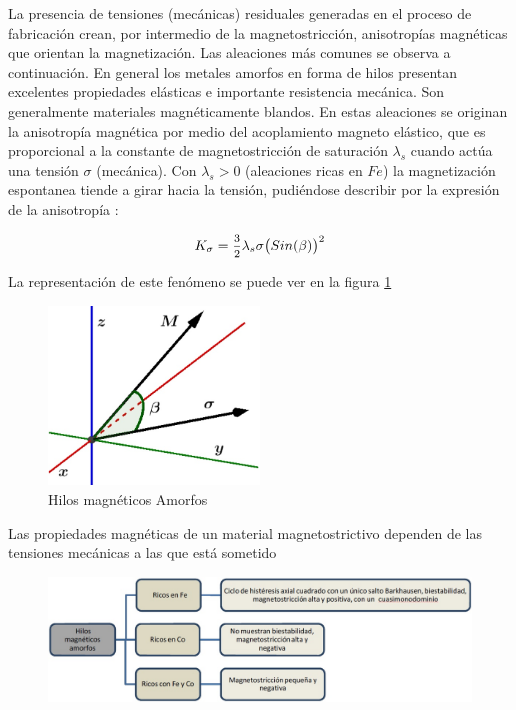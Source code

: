 La presencia de tensiones (mecánicas) residuales generadas en el proceso de fabricación crean, por intermedio de la magnetostricción, anisotropías magnéticas que orientan la magnetización. Las aleaciones más comunes se observa a continuación. En general los metales amorfos en forma de hilos presentan excelentes propiedades elásticas e importante resistencia mecánica. Son generalmente materiales magnéticamente blandos. En estas aleaciones se originan la anisotropía magnética por medio del acoplamiento magneto elástico, que es proporcional a la constante de magnetostricción de saturación $\lambda_{s}$ cuando actúa una tensión $\sigma$ (mecánica). Con $\lambda_{s} > 0$ (aleaciones ricas en $Fe$) la magnetización espontanea tiende a girar hacia la tensión, pudiéndose describir por la expresión de la anisotropía :

\begin{equation}
K_{\sigma} = \mfrac{3}{2}\lambda_{s}\sigma\big(Sin(\beta)\big)^{2}
\end{equation}

La representación de este fenómeno se puede ver en la figura \ref{fig:38}

\begin{figure}[H]
    \centering
    \includegraphics[width=0.5\textwidth]{./Figures/fig38}
	\caption{Hilos magnéticos Amorfos}
	\label{fig:38}    
\end{figure}

Las propiedades magnéticas de un material magnetostrictivo dependen de las tensiones mecánicas a las que está sometido

\begin{figure}[H]
    \centering
    \includegraphics[width=1.1\textwidth]{./Figures/fig39}  
\end{figure}


